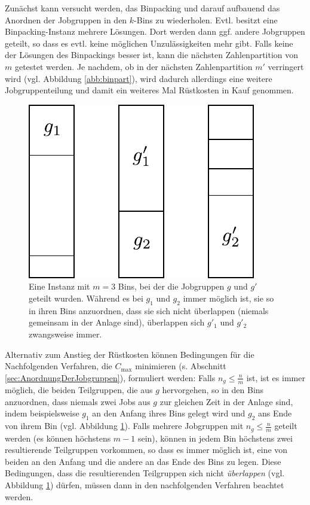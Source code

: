 \documentclass{scrreprt}
\begin{document}
Zunächst kann versucht werden, das Binpacking und darauf aufbauend das Anordnen der Jobgruppen in den $k$-Bins zu wiederholen.
Evtl. besitzt eine Binpacking-Instanz mehrere Lösungen.
Dort werden dann ggf. andere Jobgruppen geteilt, so dass es evtl. keine möglichen Unzulässigkeiten mehr gibt.
Falls keine der Lösungen des Binpackings besser ist, kann die nächsten Zahlenpartition von $m$ getestet werden.
Je nachdem, ob in der nächsten Zahlenpartition $m'$ verringert wird (vgl. Abbildung \ref{abb:binpart}),
wird dadurch allerdings eine weitere Jobgruppenteilung und damit ein weiteres Mal Rüstkosten in Kauf genommen.

\begin{figure}
    \begin{center}
        \includegraphics[width=.4\textwidth]{graphics/ueberlappen.pdf}
    \end{center}
    \caption{
        \label{abb:ueberlappen}
        Eine Instanz mit $m=3$ Bins, bei der die Jobgruppen $g$ und $g'$ geteilt wurden.
        Während es bei $g_1$ und $g_2$ immer möglich ist, sie so in ihren Bins anzuordnen, dass sie sich nicht überlappen
        (niemals gemeinsam in der Anlage sind), überlappen sich $g'_1$ und $g'_2$ zwangsweise immer.
    }
\end{figure}
Alternativ zum Anstieg der Rüstkosten können Bedingungen für die Nachfolgenden Verfahren, die $C_{\max}$ minimieren (s. Abschnitt \ref{sec:AnordnungDerJobgruppen}), 
formuliert werden:
Falls $n_g \leq \frac{n}{m}$ ist, ist es immer möglich, die beiden Teilgruppen, die aus $g$ hervorgehen,
so in den Bins anzuordnen, dass niemals zwei Jobs aus $g$ zur gleichen Zeit in der Anlage sind, indem beispielsweise
$g_1$ an den Anfang ihres Bins gelegt wird und $g_2$ ans Ende von ihrem Bin (vgl. Abbildung \ref{abb:ueberlappen}).
Falls mehrere Jobgruppen mit $n_g \leq \frac{n}{m}$ geteilt werden (es können höchstens $m-1$ sein), können in jedem Bin höchstens zwei resultierende 
Teilgruppen vorkommen, so dass es immer möglich ist, eine von beiden an den Anfang und die andere an das Ende des Bins zu legen.
Diese Bedingungen, dass die resultierenden Teilgruppen sich nicht \textit{überlappen} (vgl. Abbildung \ref{abb:ueberlappen}) dürfen, 
müssen dann in den nachfolgenden Verfahren beachtet werden.
\end{document}
